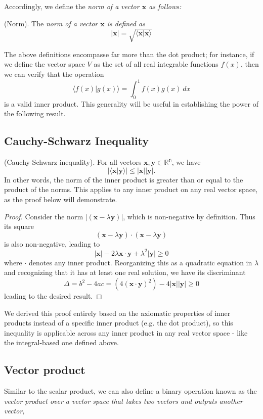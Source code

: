 \documentclass{article}
\begin{document}
Accordingly, we define the \it norm \normalfont of a vector $\mathbf{x}$ as follows:
\begin{definition}
    (Norm). The \it norm \normalfont of a vector $\mathbf{x}$ is defined as 
    \begin{equation}
        |\mathbf{x}|=\sqrt{\langle\mathbf{x}|\mathbf{x}\rangle}
    \end{equation}
\end{definition}
The above definitions encompasse far more than the dot product; for instance, if we define the vector space $V$ as the set of all real integrable functions $f(x)$, then we can verify that the operation 
\begin{equation}
    \langle f(x)|g(x) \rangle = \int_{0}^{1} f(x)g(x)\ dx
\end{equation}
is a valid inner product. This generality will be useful in establishing the power of the following result.
\subsection{Cauchy-Schwarz Inequality}
\begin{theorem}
    (Cauchy-Schwarz inequality). For all vectors $\mathbf{x,y}\in\mathbb{R^n}$, we have 
    \begin{equation}
        |\langle \mathbf{x | y}\rangle| \leq |\mathbf{x}||\mathbf{y}|.
    \end{equation}
    In other words, the norm of the inner product is greater than or equal to the product of the norms. This applies to any inner product on any real vector space, as the proof below will demonstrate.
\end{theorem}
\begin{proof}
    Consider the norm $|(\mathbf{x}-\lambda\mathbf{y})|$, which is non-negative by definition. Thus its square
    \begin{equation*}
        (\mathbf{x}-\lambda\mathbf{y})\cdot (\mathbf{x}-\lambda\mathbf{y})
    \end{equation*}
    is also non-negative, leading to 
    \begin{equation*}
        |\mathbf{x}| - 2\lambda \mathbf{x\cdot y} +\lambda^2 |\mathbf{y}| \geq 0
    \end{equation*}
    where $\cdot$ denotes any inner product. Reorganizing this as a quadratic equation in $\lambda$ and recognizing that it has at least one real solution, we have its discriminant
    \begin{equation*}
        \Delta = b^2-4ac=(4\mathbf{(x\cdot y)}^2) - 4|\mathbf{x||y|}\geq 0
    \end{equation*}
    leading to the desired result.
\end{proof}
We derived this proof entirely based on the axiomatic properties of inner products instead of a specific inner product (e.g. the dot product), so this inequality is applicable across any inner product in any real vector space - like the integral-based one defined above.
\subsection{Vector product}
Similar to the scalar product, we can also define a binary operation known as the \it vector product \normalfont over a vector space that takes two vectors and outputs another vector, 
\end{document}
